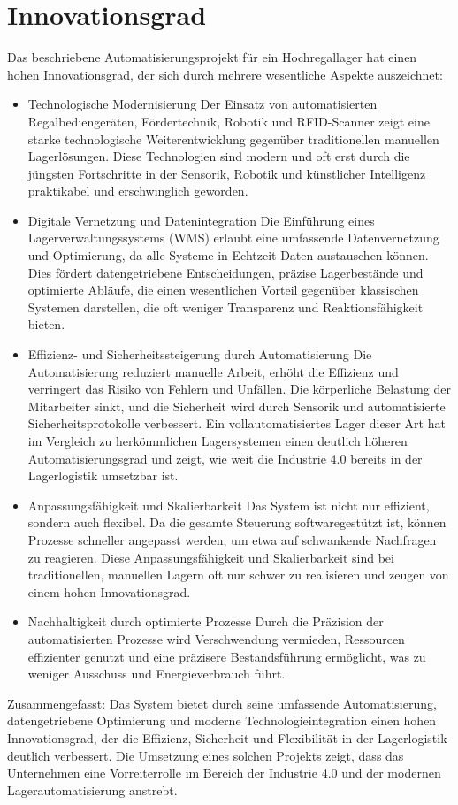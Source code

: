 \chapter{Innovationsgrad}
\label{cha:Einleitung}

Das beschriebene Automatisierungsprojekt für ein Hochregallager hat einen hohen Innovationsgrad, der sich durch mehrere wesentliche Aspekte auszeichnet:

\begin{itemize}
	\item Technologische Modernisierung
	 Der Einsatz von automatisierten Regalbediengeräten, Fördertechnik, Robotik und RFID-Scanner zeigt eine starke technologische Weiterentwicklung gegenüber traditionellen manuellen Lagerlösungen. Diese Technologien sind modern und oft erst durch die jüngsten Fortschritte in der Sensorik, Robotik und künstlicher Intelligenz praktikabel und erschwinglich geworden.
	\item Digitale Vernetzung und Datenintegration
	Die Einführung eines Lagerverwaltungssystems (WMS) erlaubt eine umfassende Datenvernetzung und Optimierung, da alle Systeme in Echtzeit Daten austauschen können. Dies fördert datengetriebene Entscheidungen, präzise Lagerbestände und optimierte Abläufe, die einen wesentlichen Vorteil gegenüber klassischen Systemen darstellen, die oft weniger Transparenz und Reaktionsfähigkeit bieten.
	\item Effizienz- und Sicherheitssteigerung durch Automatisierung
	 Die Automatisierung reduziert manuelle Arbeit, erhöht die Effizienz und verringert das Risiko von Fehlern und Unfällen. Die körperliche Belastung der Mitarbeiter sinkt, und die Sicherheit wird durch Sensorik und automatisierte Sicherheitsprotokolle verbessert. Ein vollautomatisiertes Lager dieser Art hat im Vergleich zu herkömmlichen Lagersystemen einen deutlich höheren Automatisierungsgrad und zeigt, wie weit die Industrie 4.0 bereits in der Lagerlogistik umsetzbar ist.
	\item Anpassungsfähigkeit und Skalierbarkeit
	Das System ist nicht nur effizient, sondern auch flexibel. Da die gesamte Steuerung softwaregestützt ist, können Prozesse schneller angepasst werden, um etwa auf schwankende Nachfragen zu reagieren. Diese Anpassungsfähigkeit und Skalierbarkeit sind bei traditionellen, manuellen Lagern oft nur schwer zu realisieren und zeugen von einem hohen Innovationsgrad.
	\item Nachhaltigkeit durch optimierte Prozesse
	 Durch die Präzision der automatisierten Prozesse wird Verschwendung vermieden, Ressourcen effizienter genutzt und eine präzisere Bestandsführung ermöglicht, was zu weniger Ausschuss und Energieverbrauch führt.
\end{itemize}
Zusammengefasst: Das System bietet durch seine umfassende Automatisierung, datengetriebene Optimierung und moderne Technologieintegration einen hohen Innovationsgrad, der die Effizienz, Sicherheit und Flexibilität in der Lagerlogistik deutlich verbessert. Die Umsetzung eines solchen Projekts zeigt, dass das Unternehmen eine Vorreiterrolle im Bereich der Industrie 4.0 und der modernen Lagerautomatisierung anstrebt.